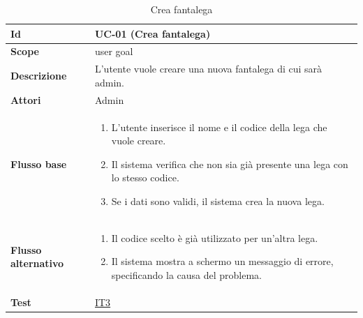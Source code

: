 \begin{table}[H]
\caption{Crea fantalega}
\label{UC-01}

\begin{tabularx}{\textwidth}{|l|X|}
\hline
\textbf{Id} & UC-01 (Crea fantalega) \\
\hline
\textbf{Scope} & user goal \\
\hline
\textbf{Descrizione} & L'utente vuole creare una nuova fantalega di cui sarà admin. \\
\hline
\textbf{Attori} & Admin \\
\hline
\textbf{Flusso base} &
\begin{enumerate}[leftmargin=*]
    \item L'utente inserisce il nome e il codice della lega che vuole creare.
    \item Il sistema verifica che non sia già presente una lega con lo stesso codice.
    \item Se i dati sono validi, il sistema crea la nuova lega.
\end{enumerate} \\
\hline
\textbf{Flusso alternativo} &
\begin{enumerate}[leftmargin=*,label=2.\arabic*]
    \item Il codice scelto è già utilizzato per un'altra lega.
    \item Il sistema mostra a schermo un messaggio di errore, specificando la causa del problema.
\end{enumerate} \\
\hline
\textbf{Test} & \hyperref[IT3]{IT3} \\
\hline
\end{tabularx}

\end{table}



